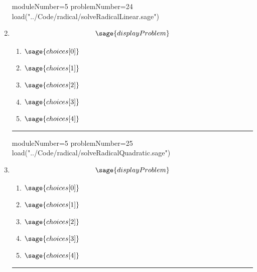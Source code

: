 \documentclass[14pt]{article}
\newcommand{\litem}[1]{\item#1\hspace*{-1cm}\rule{\textwidth}{0.4pt}}
\begin{document}
\begin{enumerate}
\begin{sagesilent}
moduleNumber=5
problemNumber=24
load("../Code/radical/solveRadicalLinear.sage")
\end{sagesilent}

\litem{

\[ \sage{displayProblem} \]

	\begin{enumerate}[label=\Alph*.]
		\item \( \sage{choices[0]} \)
		\item \( \sage{choices[1]} \)
		\item \( \sage{choices[2]} \)
		\item \( \sage{choices[3]} \)
		\item \( \sage{choices[4]} \)
	\end{enumerate}
}

\begin{sagesilent}
moduleNumber=5
problemNumber=25
load("../Code/radical/solveRadicalQuadratic.sage")
\end{sagesilent}

\litem{

\[ \sage{displayProblem} \]

	\begin{enumerate}[label=\Alph*.]
		\item \( \sage{choices[0]} \)
		\item \( \sage{choices[1]} \)
		\item \( \sage{choices[2]} \)
		\item \( \sage{choices[3]} \)
		\item \( \sage{choices[4]} \)
	\end{enumerate}
}

\end{enumerate}
\end{document}
